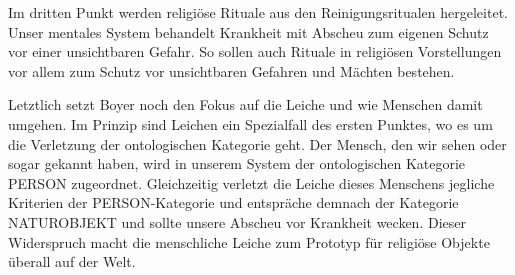 Im dritten Punkt werden religiöse Rituale aus den Reinigungsritualen hergeleitet. Unser mentales System behandelt Krankheit mit Abscheu zum eigenen Schutz vor einer unsichtbaren Gefahr. So sollen auch Rituale in religiösen Vorstellungen vor allem zum Schutz vor unsichtbaren Gefahren und Mächten bestehen. 

Letztlich setzt Boyer noch den Fokus auf die Leiche und wie Menschen damit umgehen. Im Prinzip sind Leichen ein Spezialfall des ersten Punktes, wo es um die Verletzung der ontologischen Kategorie geht. Der Mensch, den wir sehen oder sogar gekannt haben, wird in unserem System der ontologischen Kategorie PERSON zugeordnet. Gleichzeitig verletzt die Leiche dieses Menschens jegliche Kriterien der PERSON-Kategorie und entspräche demnach der Kategorie NATUROBJEKT und sollte unsere Abscheu vor Krankheit wecken. Dieser Widerspruch macht die menschliche Leiche zum Prototyp für religiöse Objekte überall auf der Welt.